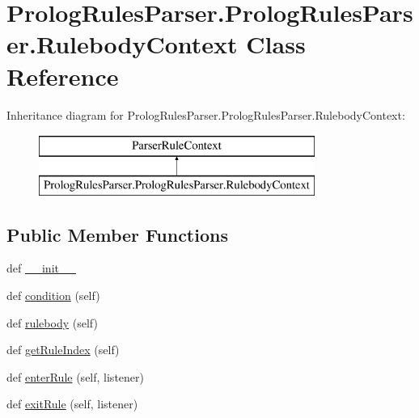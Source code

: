 \hypertarget{class_prolog_rules_parser_1_1_prolog_rules_parser_1_1_rulebody_context}{}\section{Prolog\+Rules\+Parser.\+Prolog\+Rules\+Parser.\+Rulebody\+Context Class Reference}
\label{class_prolog_rules_parser_1_1_prolog_rules_parser_1_1_rulebody_context}
Inheritance diagram for Prolog\+Rules\+Parser.\+Prolog\+Rules\+Parser.\+Rulebody\+Context\+:\begin{figure}[H]
\begin{center}
\leavevmode
\includegraphics[height=2.000000cm]{class_prolog_rules_parser_1_1_prolog_rules_parser_1_1_rulebody_context}
\end{center}
\end{figure}
\subsection*{Public Member Functions}
\begin{DoxyCompactItemize}
\item 
def \hyperlink{class_prolog_rules_parser_1_1_prolog_rules_parser_1_1_rulebody_context_ae146bb5ff3a101fe95d83ca0a3c2986f}{\+\_\+\+\_\+init\+\_\+\+\_\+}
\item 
def \hyperlink{class_prolog_rules_parser_1_1_prolog_rules_parser_1_1_rulebody_context_af95d4898f23775498a24f4786adeea39}{condition} (self)
\item 
def \hyperlink{class_prolog_rules_parser_1_1_prolog_rules_parser_1_1_rulebody_context_a8a3fe0ec5f2609859b349c123b2ed768}{rulebody} (self)
\item 
def \hyperlink{class_prolog_rules_parser_1_1_prolog_rules_parser_1_1_rulebody_context_a0dfad716e2eae22e6c2f7d1951581c2c}{get\+Rule\+Index} (self)
\item 
def \hyperlink{class_prolog_rules_parser_1_1_prolog_rules_parser_1_1_rulebody_context_ab51b9a6df488dca23f3dcd3107b46f78}{enter\+Rule} (self, listener)
\item 
def \hyperlink{class_prolog_rules_parser_1_1_prolog_rules_parser_1_1_rulebody_context_a1fd2c82516d70578fe3dac7c171c3f82}{exit\+Rule} (self, listener)
\end{DoxyCompactItemize}
